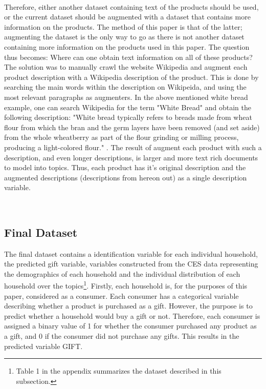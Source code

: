 \

Therefore, either another dataset containing text of the products should be used, or the current dataset should be augmented with a dataset that contains more information on the products. The method of this paper is that of the latter; augmenting the dataset is the only way to go as there is not another dataset containing more information on the products used in this paper. The question thus becomes: Where can one obtain text information on all of these products? The solution was to manually crawl the website Wikipedia and augment each product description with a Wikipedia description of the product. This is done by searching the main words within the description on Wikipeida, and using the most relevant paragraphs as augmenters. In the above mentioned white bread example, one can search Wikipedia for the term "White Bread" and obtain the following description: "White bread typically refers to breads made from wheat flour from which the bran and the germ layers have been removed (and set aside) from the whole wheatberry as part of the flour grinding or milling process, producing a light-colored flour." \citep{wiki}. The result of augment each product with such a description, and even longer descriptions, is larger and more text rich documents to model into topics. Thus, each product has it's original description and the augmented descriptions (descriptions from hereon out) as a single description variable. 

\









\subsection{Final Dataset} %
\label{sub:final_dataset}

The final dataset contains a identification variable for each individual household, the predicted gift variable, variables constructed from the CES data representing the demographics of each household and the individual distribution of each household over the topics\footnote{Table 1 in the appendix summarizes the dataset described in this subsection.}. Firstly, each household is, for the purposes of this paper, considered as a consumer. Each consumer has a categorical variable describing whether a product is purchased as a gift. However, the purpose is to predict whether a household would buy a gift or not. Therefore, each consumer is assigned a binary value of 1 for whether the consumer purchased any product as a gift, and 0 if the consumer did not purchase any gifts. This results in the predicted variable GIFT. 

